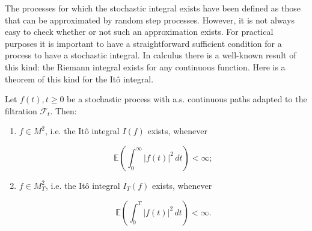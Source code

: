 The processes for which the stochastic integral exists have been defined as those that can be approximated by random step processes. However, it is not always easy to check whether or not such an approximation exists. For practical purposes it is important to have a straightforward sufficient condition for a process to have a stochastic integral. In calculus there is a well-known result of this kind: the Riemann integral exists for any continuous function. Here is a theorem of this kind for the Itô integral.

\begin{Theorem}
\label{th:7.1}
Let $f(t), t \geq 0$ be a stochastic process with a.s. continuous paths adapted to the filtration $\mathcal{F}_t$. Then:

\begin{enumerate}
\item $f \in M^2$, i.e. the Itô integral $I(f)$ exists, whenever

\begin{equation}
\mathbb{E}\left(\int_0^\infty |f(t)|^2 \, dt\right) < \infty;
\label{eq:thm7_1_cond1}
\end{equation}

\item $f \in M_T^2$, i.e. the Itô integral $I_T(f)$ exists, whenever

\begin{equation}
\mathbb{E}\left(\int_0^T |f(t)|^2 \, dt\right) < \infty.
\label{eq:thm7_1_cond2}
\end{equation}
\end{enumerate}
\end{Theorem}

